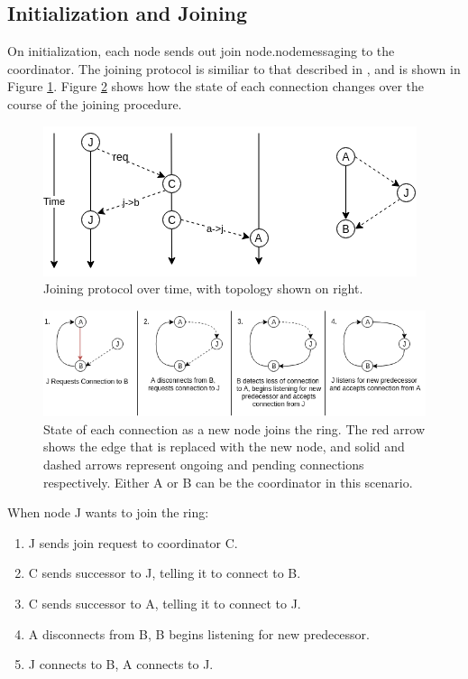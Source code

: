 \documentclass[12pt]{article}
\begin{document}
\subsection{Initialization and Joining}

On initialization, each node sends out join node.nodemessaging to the coordinator. The
joining protocol is similiar to that described in \cite{join}, and is shown in Figure \ref{fig:join}.
Figure \ref{fig:bigjoin} shows how the state of each connection changes over the course of
the joining procedure.

\begin{figure}[!ht]
\centering
  \centering
  \includegraphics[width=.6\linewidth]{images/join}
  \caption{Joining protocol over time, with topology shown on right.}
\label{fig:join}
\end{figure}

\begin{figure}[!ht]
  \centering
  \includegraphics[width=\linewidth]{images/bigflow}
  \caption{State of each connection as a new node joins the ring. The red arrow
shows the edge that is replaced with the new node, and solid and dashed
arrows represent ongoing and pending connections respectively. Either A or
B can be the coordinator in this scenario.}
\label{fig:bigjoin}
\end{figure}
\FloatBarrier

\noindent When node J wants to join the ring:
\begin{enumerate}
    \item J sends join request to coordinator C.
    \item C sends successor to J, telling it to connect to B.
    \item C sends successor to A, telling it to connect to J. 
    \item A disconnects from B, B begins listening for new predecessor.
    \item J connects to B, A connects to J.
\end{enumerate}
\end{document}
